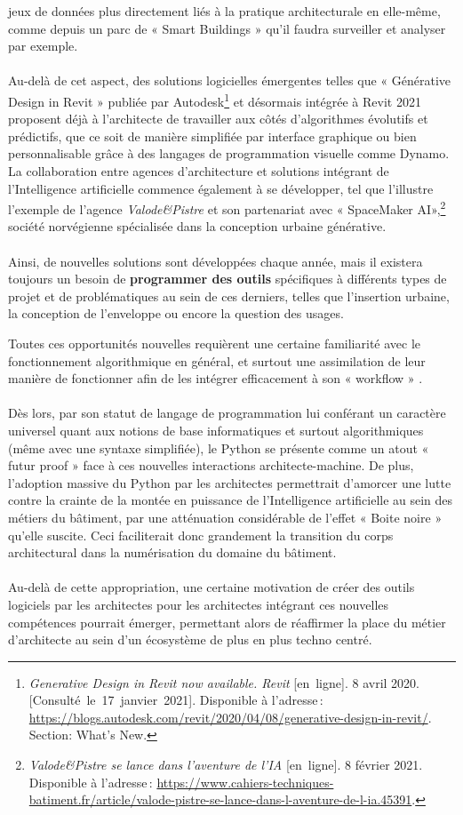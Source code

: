 \documentclass[
  11pt,
  french,
]{article}
\begin{document}
jeux de données plus directement liés à la pratique architecturale en
elle-même, comme depuis un parc de « Smart Buildings » qu'il faudra
surveiller et analyser par exemple.\\
~\\
Au-delà de cet aspect, des solutions logicielles émergentes telles que «
Générative Design in Revit » publiée par Autodesk\footnote{\emph{Generative
  Design in Revit now available. Revit} {[}en~ligne{]}. 8 avril 2020.
  {[}Consulté~le~17~janvier~2021{]}. Disponible à l'adresse\,:
  \url{https://blogs.autodesk.com/revit/2020/04/08/generative-design-in-revit/}.
  Section: What's New.} et désormais intégrée à Revit 2021 proposent
déjà à l'architecte de travailler aux côtés d'algorithmes évolutifs et
prédictifs, que ce soit de manière simplifiée par interface graphique ou
bien personnalisable grâce à des langages de programmation visuelle
comme Dynamo. La collaboration entre agences d'architecture et solutions
intégrant de l'Intelligence artificielle commence également à se
développer, tel que l'illustre l'exemple de l'agence
\emph{Valode\&Pistre} et son partenariat avec « SpaceMaker
AI»,\footnote{\emph{Valode\&Pistre se lance dans l'aventure de l'IA}
  {[}en~ligne{]}. 8 février 2021. Disponible à l'adresse\,:
  \url{https://www.cahiers-techniques-batiment.fr/article/valode-pistre-se-lance-dans-l-aventure-de-l-ia.45391}.}
société norvégienne spécialisée dans la conception urbaine générative.\\
~\\
Ainsi, de nouvelles solutions sont développées chaque année, mais il
existera toujours un besoin de \textbf{programmer des outils}
spécifiques à différents types de projet et de problématiques au sein de
ces derniers, telles que l'insertion urbaine, la conception de
l'enveloppe ou encore la question des usages.

\hfill\break
\hfill\break
Toutes ces opportunités nouvelles requièrent une certaine familiarité
avec le fonctionnement algorithmique en général, et surtout une
assimilation de leur manière de fonctionner afin de les intégrer
efficacement à son « workflow » .\\
~\\
Dès lors, par son statut de langage de programmation lui conférant un
caractère universel quant aux notions de base informatiques et surtout
algorithmiques (même avec une syntaxe simplifiée), le Python se présente
comme un atout « futur proof » face à ces nouvelles interactions
architecte-machine. De plus, l'adoption massive du Python par les
architectes permettrait d'amorcer une lutte contre la crainte de la
montée en puissance de l'Intelligence artificielle au sein des métiers
du bâtiment, par une atténuation considérable de l'effet « Boite noire »
qu'elle suscite. Ceci faciliterait donc grandement la transition du
corps architectural dans la numérisation du domaine du bâtiment.\\
~\\
Au-delà de cette appropriation, une certaine motivation de créer des
outils logiciels par les architectes pour les architectes intégrant ces
nouvelles compétences pourrait émerger, permettant alors de réaffirmer
la place du métier d'architecte au sein d'un écosystème de plus en plus
techno centré.
\end{document}
